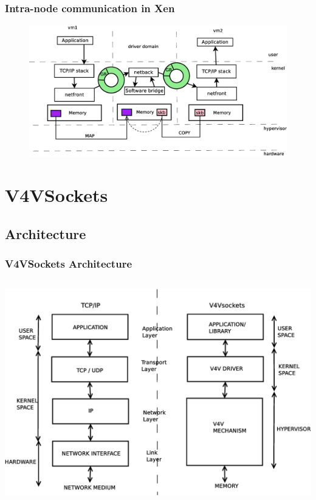 \documentclass[red,slidestop,notes,compress,mathserif]{beamer}
\begin{document}
\begin{frame}
\frametitle{Intra-node communication in Xen}
\begin{figure}
\includegraphics[width=\textwidth]{figures/netfront_netback.eps}
\end{figure}
\end{frame}


\section{V4VSockets}

\subsection{Architecture}

\begin{frame}
\frametitle{V4VSockets Architecture}
\begin{columns}
\includegraphics[width=\textwidth]{figures/tcp_ip_vs_v4vsockets.eps}
\end{columns}
\end{frame}
\end{document}
